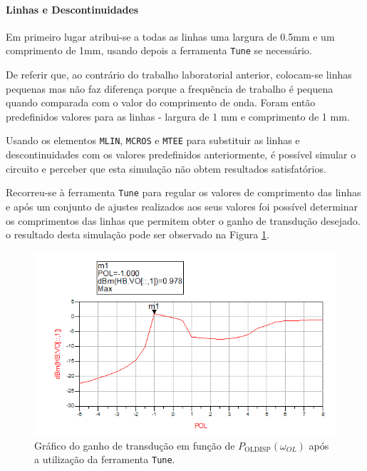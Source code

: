 \documentclass[11pt]{article}
\numberwithin{equation}{section}
\begin{document}
\pagebreak

\paragraph{Linhas e Descontinuidades} \hspace{0pt} 

Em primeiro lugar atribui-se a todas as linhas uma largura de 0.5mm e um comprimento de 1mm, usando depois a ferramenta \texttt{Tune} se necessário.

De referir que, ao contrário do trabalho laboratorial anterior, colocam-se linhas pequenas mas não faz diferença porque a frequência de trabalho é pequena quando comparada com o valor do comprimento de onda. Foram então predefinidos valores para as linhas - largura de 1 mm e comprimento de 1 mm.

Usando os elementos \texttt{MLIN}, \texttt{MCROS} e \texttt{MTEE} para substituir as linhas e descontinuidades com os valores predefinidos anteriormente, é possível simular o circuito e perceber que esta simulação não obtem resultados satisfatórios.

Recorreu-se à ferramenta \texttt{Tune} para regular os valores de comprimento das linhas e após um conjunto de ajustes realizados aos seus valores foi possível determinar os comprimentos das linhas que permitem obter o ganho de transdução desejado. o resultado desta simulação pode ser observado na Figura \ref{fig:GT_tune}.

\begin{figure}[h]
\centering
\includegraphics[keepaspectratio=true, scale=0.60]{exps/GT_tune}
\vspace{-0.5em}
\caption{Gráfico do ganho de transdução em função de $ P_{\text{OLDISP}}\left(\omega_{OL}\right) $ após a utilização da ferramenta \texttt{Tune}.}
\vspace{-0.8em}
\label{fig:GT_tune}
\end{figure}
\end{document}
